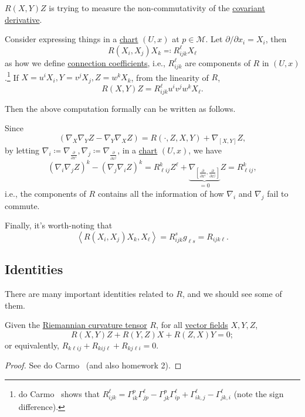 \begin{intuition}
	\(R(X, Y)Z\) is trying to measure the non-commutativity of the \hyperref[def:covariant-derivative]{covariant derivative}.
\end{intuition}

Consider expressing things in a \hyperref[def:local-coordinate]{chart} \((U, x)\) at \(p\in \mathcal{M} \). Let \(\partial /\partial x_i = X_i\), then
\[
	R(X_i, X_j) X_k \eqqcolon R^{\ell }_{ijk} X_{\ell }
\]
as how we define \hyperref[not:connection-coefficient]{connection coefficients}, i.e., \(R^{\ell }_{ijk} \) are components of \(R\) in \((U, x)\).\footnote{do Carmo~\cite[Page 93]{flaherty2013riemannian} shows that \(R^{\ell }_{ijk} = \Gamma _{ik}^p \Gamma ^\ell _{jp} - \Gamma ^p_{jk} \Gamma ^\ell _{ip} + \Gamma ^\ell _{ik, j} - \Gamma ^\ell _{jk, i}\) (note the sign difference).} If \(X = u^i X_i, Y = v^j X_j, Z = w^k X_k\), from the linearity of \(R\),
\[
	R(X, Y)Z = R^{\ell }_{ijk} u^i v^j w^k X_{\ell }.
\]

Then the above computation formally can be written as follows.

\begin{remark}
	Since
	\[
		\left( \nabla _X \nabla _Y Z - \nabla _Y \nabla _X Z \right) = R(\cdot, Z, X, Y) + \nabla _{[X, Y]} Z,
	\]
	by letting \(\nabla _i \coloneqq \nabla _{\frac{\partial }{\partial x^i} }, \nabla _j \coloneqq \nabla _{\frac{\partial }{\partial x^j} }\), in a \hyperref[def:coordinate-chart]{chart} \((U, x)\), we have
	\[
		(\nabla _i \nabla _j Z)^k - (\nabla _j \nabla _i Z)^k
		= R^k_{\ell ij} Z^{\ell } + \underbrace{\nabla _{\left[ \frac{\partial }{\partial x^i} , \frac{\partial }{\partial x^j} \right] }}_{=0} Z
		= R^k_{\ell ij},
	\]
	i.e., the components of \(R\) contains all the information of how \(\nabla _i\) and \(\nabla _j\) fail to commute.
\end{remark}

Finally, it's worth-noting that
\[
	\left\langle R(X_i, X_j) X_k, X_{\ell } \right\rangle = R^{s}_{ijk} g_{\ell s} = R_{i j k \ell }.
\]

\subsection{Identities}
There are many important identities related to \(R\), and we should see some of them.

\begin{proposition}\label{prop:1st-Bianchi-identity}
	Given the \hyperref[def:Riemannian-curvature]{Riemannian curvature tensor} \(R\), for all \hyperref[def:vector-field]{vector fields} \(X, Y, Z\),
	\[
		R(X, Y)Z + R(Y, Z)X + R(Z, X)Y = 0;
	\]
	or equivalently, \(R_{k \ell i j} + R_{k ij \ell } + R_{k j \ell i} = 0\).
\end{proposition}
\begin{proof}
	See do Carmo~\cite[Proposition 2.4]{flaherty2013riemannian} (and also homework 2).
\end{proof}

